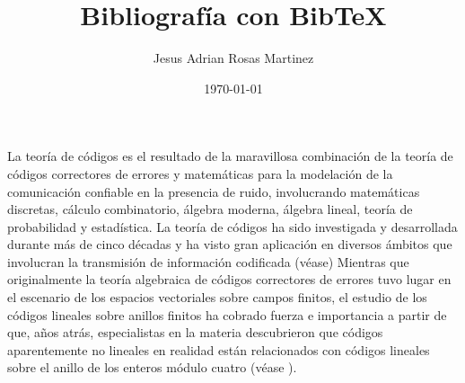 \documentclass[12pt]{article}
\title{Bibliografía con Bib\TeX}
\author{Jesus Adrian Rosas Martinez}
\date{\small{\today}}
\begin{document}
\maketitle %

La teoría de códigos es el resultado de la maravillosa combinación de la teoría de códigos correctores de errores y matemáticas para la modelación de la comunicación confiable en la presencia de ruido, involucrando matemáticas discretas, cálculo combinatorio, álgebra moderna, álgebra lineal, teoría de probabilidad y estadística. La teoría de códigos ha sido investigada y desarrollada durante más de cinco décadas y ha visto gran aplicación en diversos ámbitos que involucran la transmisión de información codificada (véase) Mientras que originalmente la teoría algebraica de códigos correctores de errores tuvo lugar en el escenario de los espacios vectoriales sobre campos finitos, el estudio de los códigos lineales sobre anillos finitos ha cobrado
fuerza e importancia a partir de que, años atrás, especialistas en la materia descubrieron que códigos aparentemente no lineales en realidad están relacionados con códigos lineales sobre el anillo de los enteros módulo cuatro (véase \cite{Calderbank}).

\renewcommand{\bibname}{Referencias}

\nocite{Conway, Honold, Ling, Pless, Qian}

\end{document}
